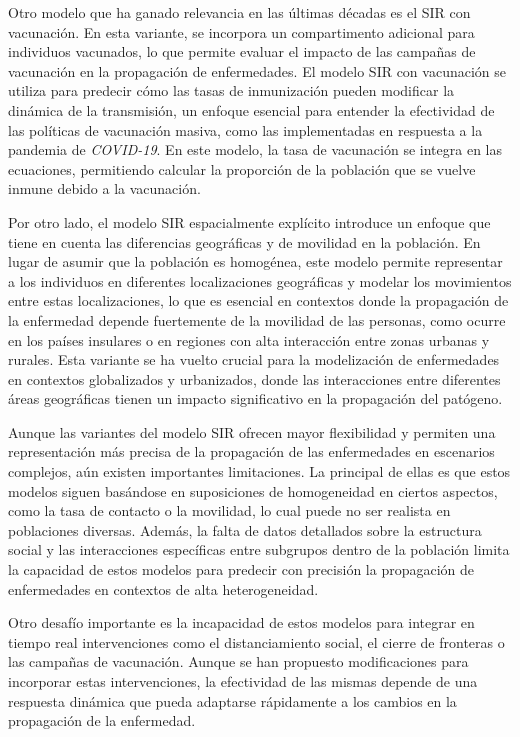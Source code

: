 Otro modelo que ha ganado relevancia en las últimas décadas es el SIR con vacunación. En esta variante, se incorpora un compartimento adicional para individuos vacunados, lo que permite evaluar el impacto de las campañas de vacunación en la propagación de enfermedades. El modelo SIR con vacunación se utiliza para predecir cómo las tasas de inmunización pueden modificar la dinámica de la transmisión\parencite{Datilo2019EpidemicForecasting, Mata2021MathematicalEpidemics}, un enfoque esencial para entender la efectividad de las políticas de vacunación masiva, como las implementadas en respuesta a la pandemia de \textit{COVID-19}. En este modelo, la tasa de vacunación se integra en las ecuaciones, permitiendo calcular la proporción de la población que se vuelve inmune debido a la vacunación.

Por otro lado, el modelo SIR espacialmente explícito introduce un enfoque que tiene en cuenta las diferencias geográficas y de movilidad en la población. En lugar de asumir que la población es homogénea, este modelo permite representar a los individuos en diferentes localizaciones geográficas y modelar los movimientos entre estas localizaciones, lo que es esencial en contextos donde la propagación de la enfermedad depende fuertemente de la movilidad de las personas, como ocurre en los países insulares o en regiones con alta interacción entre zonas urbanas y rurales\parencite{Nowzari2016ComplexNetworks}. Esta variante se ha vuelto crucial para la modelización de enfermedades en contextos globalizados y urbanizados, donde las interacciones entre diferentes áreas geográficas tienen un impacto significativo en la propagación del patógeno.

Aunque las variantes del modelo SIR ofrecen mayor flexibilidad y permiten una representación más precisa de la propagación de las enfermedades en escenarios complejos, aún existen importantes limitaciones. La principal de ellas es que estos modelos siguen basándose en suposiciones de homogeneidad en ciertos aspectos, como la tasa de contacto o la movilidad, lo cual puede no ser realista en poblaciones diversas\parencite{Moein2021SIRInefficiency}. Además, la falta de datos detallados sobre la estructura social y las interacciones específicas entre subgrupos dentro de la población limita la capacidad de estos modelos para predecir con precisión la propagación de enfermedades en contextos de alta heterogeneidad\parencite{Shinde2020ForecastingCOVID}.

Otro desafío importante es la incapacidad de estos modelos para integrar en tiempo real intervenciones como el distanciamiento social, el cierre de fronteras o las campañas de vacunación. Aunque se han propuesto modificaciones para incorporar estas intervenciones, la efectividad de las mismas depende de una respuesta dinámica que pueda adaptarse rápidamente a los cambios en la propagación de la enfermedad\parencite{Shinde2020ForecastingCOVID}.

